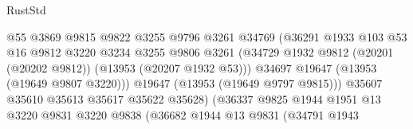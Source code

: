 \begin{lexlean}{RustStd}
\begin{coremodule}
                                            @55
                                            @3869
                                            @9815
                                            @9822
                                            @3255
                                            @9796
                                            @3261
                                            @34769
                                            (@36291
                                              @1933
                                              @103
                                              @53
                                              @16
                                              @9812
                                              @3220
                                              @3234
                                              @3255
                                              @9806
                                              @3261
                                              (@34729
                                                @1932
                                                @9812
                                                (@20201 (@20202 @9812))
                                                (@13953 (@20207 @1932 @53)))
                                              @34697
                                              @19647
                                              (@13953 (@19649 @9807 @3220)))
                                            @19647
                                            (@13953 (@19649 @9797 @9815)))
                                          @35607
                                          @35610
                                          @35613
                                          @35617
                                          @35622
                                          @35628)
                                        (@36337
                                          @9825
                                          @1944
                                          @1951
                                          @13
                                          @3220
                                          @9831
                                          @3220
                                          @9838
                                          (@36682
                                            @1944
                                            @13
                                            @9831
                                            (@34791
                                              @1943

\end{coremodule}
\end{lexlean}
